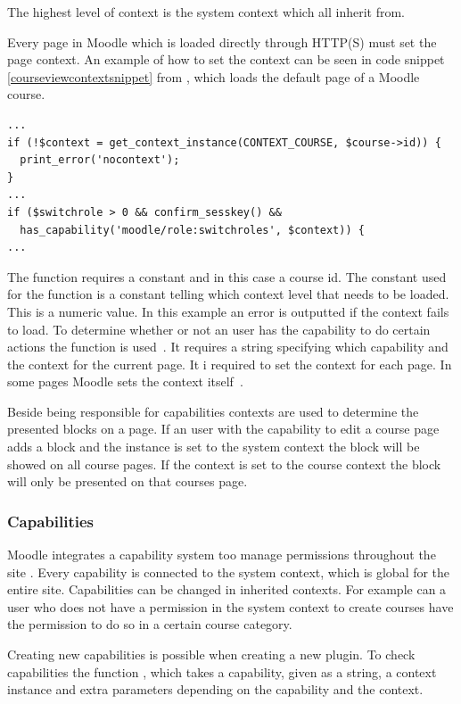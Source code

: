The highest level of context is the system context which all inherit from. 

Every page in Moodle which is loaded directly through HTTP(S) must set the page context. 
An example of how to set the context can be seen in code snippet \ref{courseviewcontextsnippet} from , which loads the default page of a Moodle course.

\begin{lstlisting}[style=phpCode, caption=\myCaption{A snippet from \moodlefile{/course/view.php}}, label=courseviewcontextsnippet]
...
if (!$context = get_context_instance(CONTEXT_COURSE, $course->id)) {
  print_error('nocontext');
}
...
if ($switchrole > 0 && confirm_sesskey() &&
  has_capability('moodle/role:switchroles', $context)) {
...	
\end{lstlisting}
The function  requires a constant and in this case a course id. 
The constant used for the function is a constant telling which context level that needs to be loaded. 
This is a numeric value. 
In this example an error is outputted if the context fails to load. 
To determine whether or not an user has the capability to do certain actions the function  is used~\cite{moodlerolesandmodules}. It requires a string specifying which capability and the context for the current page. 
It i required to set the context for each page. 
In some pages Moodle sets the context itself~\cite{moodlepageapi}. 

Beside being responsible for capabilities contexts are used to determine the presented blocks on a page. If an user with the capability to edit a course page adds a block and the instance is set to the system context the block will be showed on all course pages. If the context is set to the course context the block will only be presented on that courses page. 

	
\subsubsection{Capabilities}
\label{sub:capabilities}
Moodle integrates a capability system too manage permissions throughout the site \cite{moodlerolesandmodules}. 
Every capability is connected to the system context, which is global for the entire site. 
Capabilities can be changed in inherited contexts. 
For example can a user who does not have a permission in the system context to create courses have the permission to do so in a certain course category. 

Creating new capabilities is possible when creating a new plugin. 
To check capabilities the function , which takes a capability, given as a string, a context instance and extra parameters depending on the capability and the context. 


	
